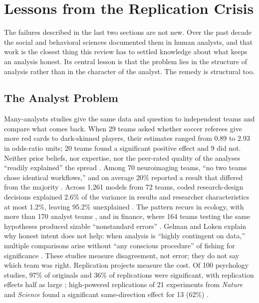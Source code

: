 \section{Lessons from the Replication Crisis}\label{sec:replication}

The failures described in the last two sections are not new. Over the past decade the social and behavioral sciences documented them in human analysts, and that work is the closest thing this review has to settled knowledge about what keeps an analysis honest. Its central lesson is that the problem lies in the structure of analysis rather than in the character of the analyst. The remedy is structural too.

\subsection{The Analyst Problem}

Many-analysts studies give the same data and question to independent teams and compare what comes back. When 29 teams asked whether soccer referees give more red cards to dark-skinned players, their estimates ranged from 0.89 to 2.93 in odds-ratio units; 20 teams found a significant positive effect and 9 did not. Neither prior beliefs, nor expertise, nor the peer-rated quality of the analyses ``readily explained'' the spread \citep{R9}. Among 70 neuroimaging teams, ``no two teams chose identical workflows,'' and on average 20\% reported a result that differed from the majority \citep{R10}. Across 1,261 models from 72 teams, coded research-design decisions explained 2.6\% of the variance in results and researcher characteristics at most 1.2\%, leaving 95.2\% unexplained \citep{R11}. The pattern recurs in ecology, with more than 170 analyst teams \citep{R16}, and in finance, where 164 teams testing the same hypotheses produced sizable ``nonstandard errors'' \citep{R17}. Gelman and Loken explain why honest intent does not help: when analysis is ``highly contingent on data,'' multiple comparisons arise without ``any conscious procedure'' of fishing for significance \citep{R12}. These studies measure disagreement, not error; they do not say which team was right. Replication projects measure the cost. Of 100 psychology studies, 97\% of originals and 36\% of replications were significant, with replication effects half as large \citep{R14}; high-powered replications of 21 experiments from \textit{Nature} and \textit{Science} found a significant same-direction effect for 13 (62\%) \citep{R18}.

